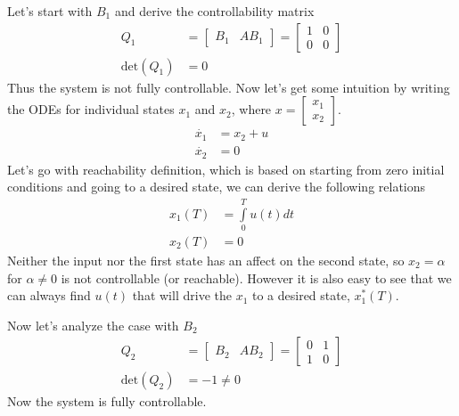 \documentclass[twoside]{article}
\begin{document}
Let's start with $B_1$ and derive the controllability matrix
%
\begin{align*}
 Q_1 &= \left[ \begin{array}{cc} B_1 & A B_1 \end{array}
                                               \right]
= \left[ \begin{array}{cc} 1 & 0 \\ 0 & 0 \end{array} \right]
\\
\mathrm{det} ( Q_1) &= 0 
\end{align*}
% 
Thus the system is not fully controllable. Now let's get some
intuition by writing the ODEs for individual states $x_1$ and $x_2$,
where $x = \left[ \begin{array}{c} x_1 \\ x_2 \end{array} \right] $.
%
\begin{align*}
  \dot{x_1} &= x_2 + u
              \\
  \dot{x_2} &= 0
\end{align*}
%
Let's go with reachability definition, which is based on starting
from zero initial conditions and going to a desired state,
we can derive the following relations
%
\begin{align*}
  x_1(T) &= \int\limits_{0}^T u(t) d t
              \\
  x_2(T) &= 0
\end{align*}
%
Neither the input nor the first state has an affect on
the second state, so $x_2 = \alpha$ for $\alpha \neq 0$
is not controllable (or reachable). However it is also easy to 
see that we can always find $u(t)$ that will drive the $x_1$ to a
desired state, $x_1^*(T)$.

Now let's analyze the case with $B_2$ 
%
\begin{align*}
 Q_2 &= \left[ \begin{array}{cc} B_2 & A B_2 \end{array}
                                               \right]
= \left[ \begin{array}{cc} 0 & 1 \\ 1 & 0 \end{array} \right]
\\
\mathrm{det} ( Q_2) &= -1 \neq 0
\end{align*}
% 
Now the system is fully controllable. 

\vspace{6pt}
\end{document}
